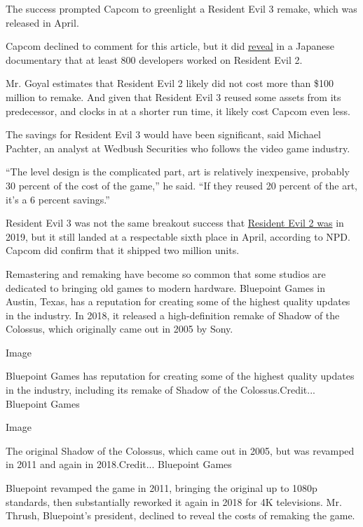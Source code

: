 The success prompted Capcom to greenlight a Resident Evil 3 remake,
which was released in April.

Capcom declined to comment for this article, but it did
\href{https://comicbook.com/gaming/news/resident-evil-2-remake-dev-team-size-over-800/}{reveal}
in a Japanese documentary that at least 800 developers worked on
Resident Evil 2.

Mr. Goyal estimates that Resident Evil 2 likely did not cost more than
\$100 million to remake. And given that Resident Evil 3 reused some
assets from its predecessor, and clocks in at a shorter run time, it
likely cost Capcom even less.

The savings for Resident Evil 3 would have been significant, said
Michael Pachter, an analyst at Wedbush Securities who follows the video
game industry.

``The level design is the complicated part, art is relatively
inexpensive, probably 30 percent of the cost of the game,'' he said.
``If they reused 20 percent of the art, it's a 6 percent savings.''

Resident Evil 3 was not the same breakout success that
\href{https://venturebeat.com/2019/02/20/january-2019-npd-sales-down-as-kingdom-hearts-tops-charts/}{Resident
Evil 2 was} in 2019, but it still landed at a respectable sixth place in
April, according to NPD. Capcom did confirm that it shipped two million
units.

Remastering and remaking have become so common that some studios are
dedicated to bringing old games to modern hardware. Bluepoint Games in
Austin, Texas, has a reputation for creating some of the highest quality
updates in the industry. In 2018, it released a high-definition remake
of Shadow of the Colossus, which originally came out in 2005 by Sony.

Image

Bluepoint Games has reputation for creating some of the highest quality
updates in the industry, including its remake of Shadow of the
Colossus.Credit... Bluepoint Games

Image

The original Shadow of the Colossus, which came out in 2005, but was
revamped in 2011 and again in 2018.Credit... Bluepoint Games

Bluepoint revamped the game in 2011, bringing the original up to 1080p
standards, then substantially reworked it again in 2018 for 4K
televisions. Mr. Thrush, Bluepoint's president, declined to reveal the
costs of remaking the game.

